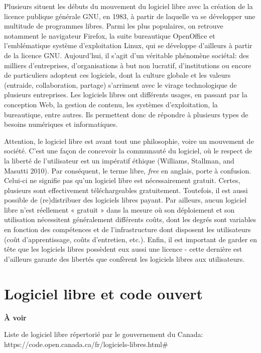 \documentclass[
  letterpaper,
]{scrbook}
\begin{document}
Plusieurs situent les débuts du mouvement du logiciel libre avec la
création de la licence publique générale GNU, en 1983, à partir de
laquelle va se développer une multitude de programmes libres. Parmi les
plus populaires, on retrouve notamment le navigateur Firefox, la suite
bureautique OpenOffice et l'emblématique système d'exploitation Linux,
qui se développe d'ailleurs à partir de la licence GNU. Aujourd'hui, il
s'agit d'un véritable phénomène sociétal: des milliers d'entreprises,
d'organisations à but non lucratif, d'institutions ou encore de
particuliers adoptent ces logiciels, dont la culture globale et les
valeurs (entraide, collaboration, partage) s'arriment avec le virage
technologique de plusieurs entreprises. Les logiciels libres ont
différents usages, en passant par la conception Web, la gestion de
contenu, les systèmes d'exploitation, la bureautique, entre autres. Ils
permettent donc de répondre à plusieurs types de besoins numériques et
informatiques.

Attention, le logiciel libre est avant tout une philosophie, voire un
mouvement de société. C'est une façon de concevoir la communauté du
logiciel, où le respect de la liberté de l'utilisateur est un impératif
éthique (Williams, Stallman, and Masutti 2010). Par conséquent, le terme
libre, \emph{free} en anglais, porte à confusion. Celui-ci ne signifie
pas qu'un logiciel libre est nécessairement gratuit. Certes, plusieurs
sont effectivement téléchargeables gratuitement. Toutefois, il est aussi
possible de (re)distribuer des logiciels libres payant. Par ailleurs,
aucun logiciel libre n'est réellement « gratuit » dans la mesure où son
déploiement et son utilisation nécessitent généralement différents
coûts, dont les degrés sont variables en fonction des compétences et de
l'infrastructure dont disposent les utilisateurs (coût d'apprentissage,
coûts d'entretien, etc.). Enfin, il est important de garder en tête que
les logiciels libres possèdent eux aussi une licence - cette dernière
est d'ailleurs garante des libertés que confèrent les logiciels libres
aux utilisateurs.

\hypertarget{logiciel-libre-et-code-ouvert}{%
\section{Logiciel libre et code
ouvert}\label{logiciel-libre-et-code-ouvert}}

\textbf{À voir}

Liste de logiciel libre répertorié par le gouvernement du Canada:
https://code.open.canada.ca/fr/logiciels-libres.html\#
\end{document}
